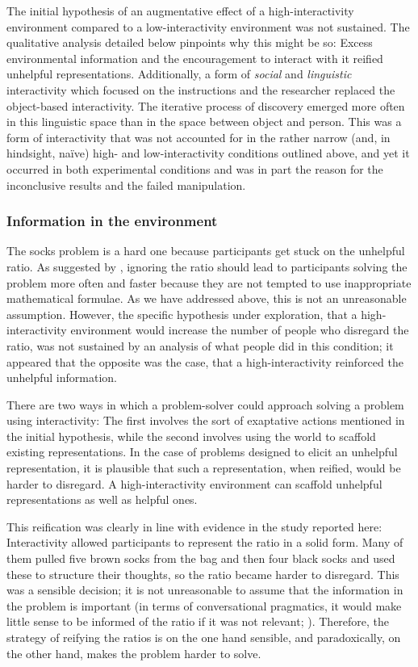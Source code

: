 \documentclass[twocolumn, issue, empirical, authordate,drafn]{jote-new-article}
\begin{document}
The initial hypothesis of an augmentative effect of a high-interactivity environment compared to a low-interactivity environment was not sustained. The qualitative analysis detailed below pinpoints why this might be so: Excess environmental information and the encouragement to interact with it reified unhelpful representations. Additionally, a form of \emph{social} and \emph{linguistic} interactivity which focused on the instructions and the researcher replaced the object-based interactivity. The iterative process of discovery emerged more often in this linguistic space than in the space between object and person. This was a form of interactivity that was not accounted for in the rather narrow (and, in hindsight, naïve) high- and low-interactivity conditions outlined above, and yet it occurred in both experimental conditions and was in part the reason for the inconclusive results and the failed manipulation. 


\subsubsection{Information in the environment}

The socks problem is a hard one because participants get stuck on the unhelpful ratio. As suggested by \textcite{Vallee-Tourangeau2020}, ignoring the ratio should lead to participants solving the problem more often and faster because they are not tempted to use inappropriate mathematical formulae. As we have addressed above, this is not an unreasonable assumption. However, the specific hypothesis under exploration, that a high-interactivity environment would increase the number of people who disregard the ratio, was not sustained by an analysis of what people did in this condition; it appeared that the opposite was the case, that a high-interactivity reinforced the unhelpful information. 

There are two ways in which a problem-solver could approach solving a problem using interactivity: The first involves the sort of exaptative actions mentioned in the initial hypothesis, while the second involves using the world to scaffold existing representations. In the case of problems designed to elicit an unhelpful representation, it is plausible that such a representation, when reified, would be harder to disregard. A high-interactivity environment can scaffold unhelpful representations as well as helpful ones. 

This reification was clearly in line with evidence in the study reported here: Interactivity allowed participants to represent the ratio in a solid form. Many of them pulled five brown socks from the bag and then four black socks and used these to structure their thoughts, so the ratio became harder to disregard. This was a sensible decision; it is not unreasonable to assume that the information in the problem is important (in terms of conversational pragmatics, it would make little sense to be informed of the ratio if it was not relevant; ). Therefore, the strategy of reifying the ratios is on the one hand sensible, and paradoxically, on the other hand, makes the problem harder to solve. 
\end{document}
